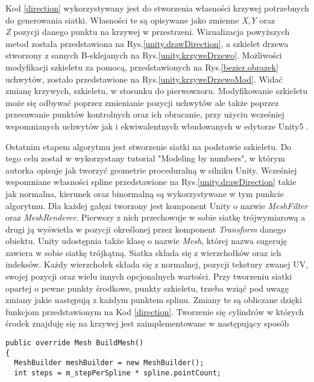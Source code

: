 \documentclass[12pt]{report}
\renewcommand{\figurename}{Rys.}
\newcommand{\codename}{Kod }
\begin{document}
\begin{sloppypar}
\codename\ref{direction} wykorzystywany jest do stworzenia własności krzywej potrzebnych do generowania siatki. Własności te są opisywane jako zmienne \textit{X},\textit{Y} oraz \\ \textit{Z} pozycji danego punktu na krzywej w przestrzeni. Wizualizacja powyższych metod została przedstawiona na \figurename \ref{unity.drawDirection}, a szkielet drzewa stworzony z samych B-sklejanych na \figurename \ref{unity.krzyweDrzewo}. Możliwości modyfikacji szkieletu za pomocą, przedstawionych na \figurename\ref{bezier.obrazek} uchwytów, zostało przedstawione na \figurename\ref{unity.krzyweDrzewoMod}. Widać zmianę krzywych, szkieletu, w stosunku do pierwowzoru. Modyfikowanie szkieletu może się odbywać poprzez zmienianie pozycji uchwytów ale także poprzez przesuwanie punktów kontrolnych oraz ich obracanie, przy użyciu wcześniej wspomnianych uchwytów jak i ekwiwalentnych wbudowanych w edytorze Unity5 .
\newline
\par Ostatnim etapem algorytmu jest stworzenie siatki na podstawie szkieletu. Do tego celu został w wykorzystany tutorial "Modeling by numbers"\cite{MBN}, w którym autorka opisuje jak tworzyć geometrie proceduralną w silniku Unity. 
Wcześniej wspomniane własności spline przedstawione na \figurename\ref{unity.drawDirection} takie jak normalna, kierunek oraz binormalną  są wykorzystywane w tym punkcie algorytmu. Dla każdej gałęzi tworzony jest komponent Unity o nazwie \textit{MeshFilter} oraz \textit{MeshRenderer}\cite{unityMesh}. Pierwszy z nich przechowuje w sobie siatkę trójwymiarową a drugi ją wyświetla w pozycji określonej przez komponent \textit{Transform} danego obiektu. Unity udostępnia także klasę o nazwie \textit{Mesh}, której nazwa sugeruję zawiera w sobie siatkę trójkątną. Siatka składa się z wierzchołków oraz ich indeksów. Każdy wierzchołek składa się z normalnej, pozycji tekstury zwanej UV, swojej pozycji oraz wielu innych opcjonalnych wartości. Przy tworzeniu siatki opartej o pewne punkty środkowe, punkty szkieletu, trzeba wziąć pod uwagę zmiany jakie następują z każdym punktem splinu. Zmiany te są obliczane dzięki funkcjom przedstawionym na 
\codename\ref{direction}. Tworzenie się cylindrów w których środek znajduję się na krzywej jest zaimplementowane w następujący sposób
\begin{lstlisting}[label=buildMesh,caption=Funkcja tworzaca cylinder w okół punktu krzywej. ,belowcaptionskip=4pt,captionpos=b]
    public override Mesh BuildMesh()
{
  MeshBuilder meshBuilder = new MeshBuilder();
  int steps = m_stepPerSpline * spline.pointCount;

\end{lstlisting}
\end{sloppypar}
\end{document}
